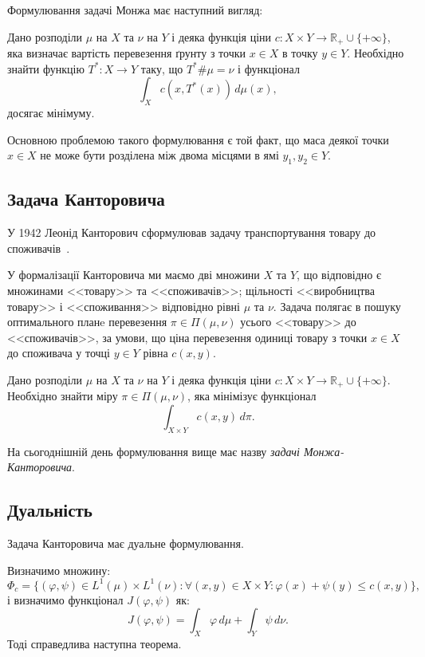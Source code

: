 Формулювання задачі Монжа має наступний вигляд:

\begin{definition}
    \label{def:monge-problem}
    Дано розподіли $\mu$ на $X$ та $\nu$ на $Y$ і деяка функція ціни $c : X \times Y \to \mathbb{R}_+ \cup \{+\infty\}$,
    яка визначає вартість перевезення ґрунту з точки $x \in X$ в точку $y \in Y$. 
    Необхідно знайти функцію $T^* : X \to Y$ таку, що $T^* \# \mu = \nu$ і функціонал
    $$
        \int_X c\left(x, T^*(x)\right)\, d\mu(x),
    $$
    досягає мінімуму.
\end{definition}

Основною проблемою такого формулювання є той факт, що маса деякої точки $x \in X $ не може бути розділена між двома місцями
в ямі $y_1, y_2 \in Y$.

\subsection{Задача Канторовича}
\label{sec:kantorovich-problem}

У 1942 Леонід Канторович сформулював задачу транспортування товару до споживачів~\cite{kantorovich2006}.

У формалізації Канторовича ми маємо дві множини $X$ та $Y$, що відповідно є множинами <<товару>> та <<споживачів>>;
щільності <<виробництва товару>> і <<споживання>> відповідно рівні $\mu$ та $\nu$.
Задача полягає в пошуку оптимального планe перевезення $\pi \in \Pi(\mu, \nu)$ усього <<товару>> до <<споживачів>>, за умови, що
ціна перевезення одиниці товару з точки $x \in X$ до споживача у точці $y \in Y$ рівна $c(x, y)$.

\begin{definition}
    \label{def:kantorovich-problem}
    Дано розподіли $\mu$ на $X$ та $\nu$ на $Y$ і деяка функція ціни $c : X \times Y \to \mathbb{R}_+ \cup \{+\infty\}$. 
    Необхідно знайти міру $\pi \in \Pi(\mu, \nu)$, яка мінімізує функціонал
    $$
        \int_{X \times Y} c(x, y)\, d\pi.
    $$
\end{definition}

На сьогоднішній день формулювання вище має назву \textit{задачі Монжа-Канторовича}.

\subsection{Дуальність}
Задача Канторовича має дуальне формулювання.

Визначимо множину:
$$
    \Phi_c = \{(\varphi, \psi) \in L^1(\mu) \times L^1(\nu) : \forall (x, y) \in X \times Y : \varphi(x) + \psi(y) \le c(x, y)\},
$$
і визначимо функціонал $J(\varphi, \psi)$ як:
$$
    J(\varphi, \psi) = \int_X \varphi\, d\mu + \int_Y \psi\, d\nu.
$$
Тоді справедлива наступна теорема.

